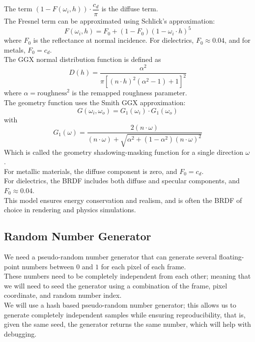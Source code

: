 \documentclass[12pt]{article}
\begin{document}
The term $(1 - F(\omega_i, h)) 
\cdot \dfrac{c_d}{\pi}$ is the diffuse term. \\

The Fresnel term can be approximated using 
Schlick's approximation:
\[ F(\omega_i, h) = F_0 + (1 - F_0)
(1 - \omega_i \cdot h)^5 \]
where $F_0$ is the reflectance at normal incidence. 
For dielectrics, $F_0 \approx 0.04$, 
and for metals, $F_0 = c_d$. \\

The GGX normal distribution function is defined as
\[ D(h) = \frac{\alpha^2}{\pi \left[ 
(n \cdot h)^2 (\alpha^2 - 1) + 1 \right]^2} \]
where $\alpha = \text{roughness}^2$ 
is the remapped roughness parameter. \\

The geometry function uses the Smith GGX approximation:
\[ G(\omega_i, \omega_o) = 
G_1(\omega_i) \cdot G_1(\omega_o) \]
with
\[ G_1(\omega) = \frac{2 (n \cdot \omega)}
{(n \cdot \omega) + \sqrt{\alpha^2 + (1 - \alpha^2)
(n \cdot \omega)^2}} \]
Which is called the geometry shadowing-masking 
function for a single direction $\omega$. \\

For metallic materials, 
the diffuse component is zero, and 
$F_0 = c_d$. \\ 
For dielectrics, the BRDF includes both 
diffuse and specular components, 
and $F_0 \approx 0.04$. \\

This model ensures energy conservation and 
realism, and is often the BRDF of choice
in rendering and physics simulations. \\

\newpage

\subsection*{Random Number Generator}

We need a pseudo-random number generator that
can generate several 
floating-point numbers between $0$
and $1$ for each pixel of each frame. \\

These numbers need to be completely independent
from each other; meaning that we will need to
seed the generator using a combination of the frame,
pixel coordinate, and random number index. \\

We will use a hash based pseudo-random number
generator; this allows us to generate completely
independent samples while ensuring reproducibility,
that is, given the same seed, the generator returns
the same number, which will help with debugging. \\
\end{document}

